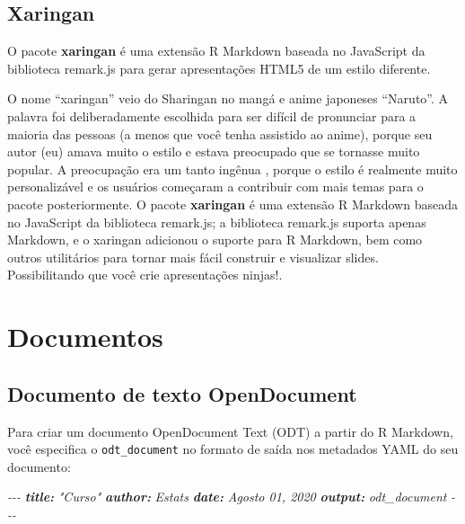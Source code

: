 \documentclass[
]{book}
\newenvironment{Shaded}{\begin{snugshade}}{\end{snugshade}}
\newcommand{\AnnotationTok}[1]{\textcolor[rgb]{0.56,0.35,0.01}{\textbf{\textit{#1}}}}
\newcommand{\CommentTok}[1]{\textcolor[rgb]{0.56,0.35,0.01}{\textit{#1}}}
\begin{document}
\hypertarget{xaringan}{%
\subsection{Xaringan}\label{xaringan}}

O pacote \textbf{xaringan} é uma extensão R Markdown baseada no JavaScript da biblioteca remark.js para gerar apresentações HTML5 de um estilo diferente.

O nome ``xaringan'' veio do Sharingan no mangá e anime japoneses ``Naruto''. A palavra foi deliberadamente escolhida para ser difícil de pronunciar para a maioria das pessoas (a menos que você tenha assistido ao anime), porque seu autor (eu) amava muito o estilo e estava preocupado que se tornasse muito popular. A preocupação era um tanto ingênua , porque o estilo é realmente muito personalizável e os usuários começaram a contribuir com mais temas para o pacote posteriormente.
O pacote \textbf{xaringan} é uma extensão R Markdown baseada no JavaScript da biblioteca remark.js; a biblioteca remark.js suporta apenas Markdown, e o xaringan adicionou o suporte para R Markdown, bem como outros utilitários para tornar mais fácil construir e visualizar slides. Possibilitando que você crie apresentações ninjas!.

\hypertarget{documentos}{%
\section{Documentos}\label{documentos}}

\hypertarget{documento-de-texto-opendocument}{%
\subsection{Documento de texto OpenDocument}\label{documento-de-texto-opendocument}}

Para criar um documento OpenDocument Text (ODT) a partir do R Markdown, você especifica o \texttt{odt\_document} no formato de saída nos metadados YAML do seu documento:

\begin{Shaded}
\begin{Highlighting}[]
\CommentTok{{-}{-}{-}}
\AnnotationTok{title:}\CommentTok{ "Curso"}
\AnnotationTok{author:}\CommentTok{ Estats}
\AnnotationTok{date:}\CommentTok{ Agosto 01, 2020}
\AnnotationTok{output:}\CommentTok{ odt\_document}
\CommentTok{{-}{-}{-}}
\end{Highlighting}
\end{Shaded}
\end{document}
